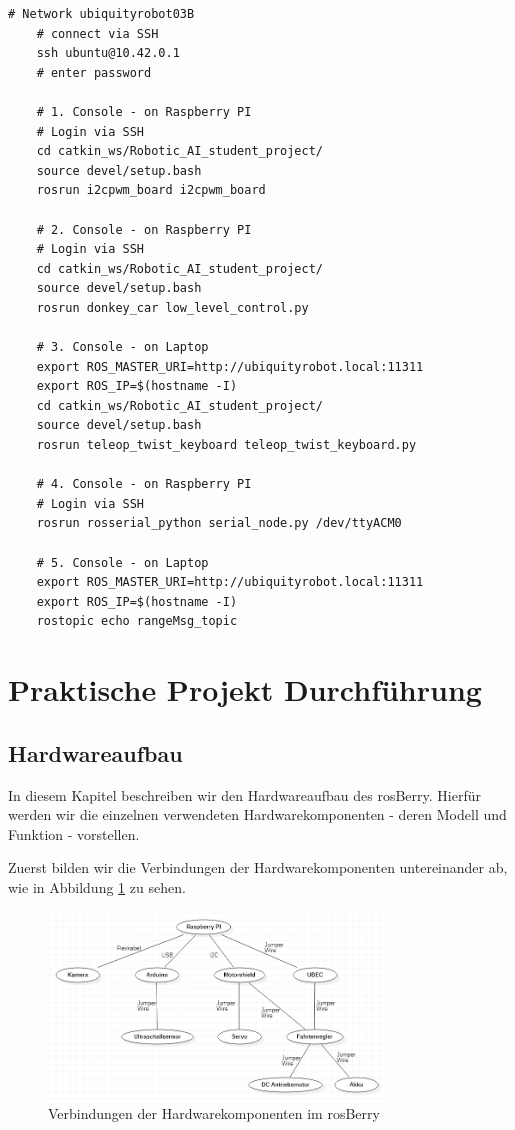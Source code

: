 \documentclass[conference]{IEEEtran}
\begin{document}
	\begin{lstlisting}[label={list:first},caption=Sample rosBash code.]
	# Network ubiquityrobot03B
	# connect via SSH
	ssh ubuntu@10.42.0.1
	# enter password
	
	# 1. Console - on Raspberry PI
	# Login via SSH
	cd catkin_ws/Robotic_AI_student_project/
	source devel/setup.bash
	rosrun i2cpwm_board i2cpwm_board
	
	# 2. Console - on Raspberry PI
	# Login via SSH
	cd catkin_ws/Robotic_AI_student_project/
	source devel/setup.bash
	rosrun donkey_car low_level_control.py
	
	# 3. Console - on Laptop 
	export ROS_MASTER_URI=http://ubiquityrobot.local:11311
	export ROS_IP=$(hostname -I)
	cd catkin_ws/Robotic_AI_student_project/
	source devel/setup.bash
	rosrun teleop_twist_keyboard teleop_twist_keyboard.py
	
	# 4. Console - on Raspberry PI
	# Login via SSH
	rosrun rosserial_python serial_node.py /dev/ttyACM0
	
	# 5. Console - on Laptop
	export ROS_MASTER_URI=http://ubiquityrobot.local:11311
	export ROS_IP=$(hostname -I)
	rostopic echo rangeMsg_topic
	\end{lstlisting}
	
	\section{Praktische Projekt Durchführung}
	
	
	\subsection{Hardwareaufbau}%
	In diesem Kapitel beschreiben wir den Hardwareaufbau des rosBerry. Hierfür werden wir die einzelnen verwendeten Hardwarekomponenten - deren Modell und Funktion - vorstellen.
	
	Zuerst bilden wir die Verbindungen der Hardwarekomponenten untereinander ab, wie in Abbildung \ref{Hardwarekomponenten} zu sehen.
	
	\begin{figure}[!ht]
		\centering
		\includegraphics[width=9cm]{img/Hardwarekomponenten.PNG}
		\caption{Verbindungen der Hardwarekomponenten im rosBerry}
		\label{Hardwarekomponenten}
	\end{figure}
	
\end{document}
